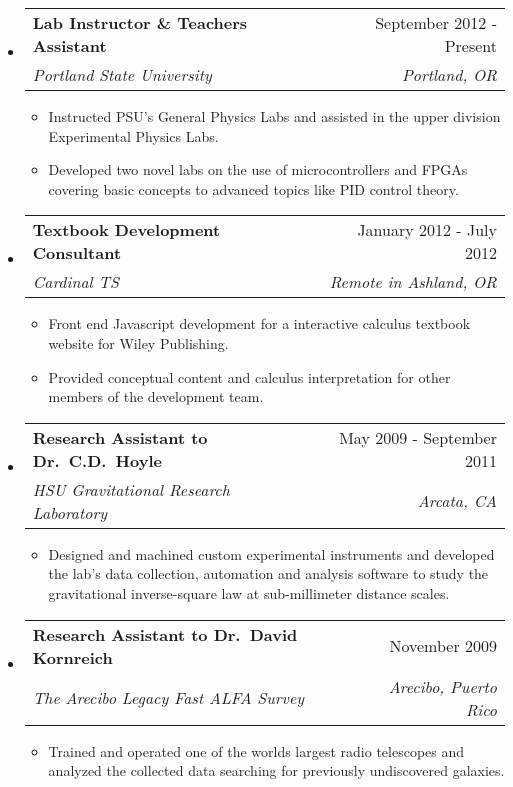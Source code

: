 \documentclass[letterpaper,11pt]{article}
\makeatletter
\newcommand{\resitem}[1]{\item #1 \vspace{-2pt}}
\newcommand{\ressubheading}[4]{
\begin{tabular*}{7.0in}{l@{\extracolsep{\fill}}r}
		\textbf{#1} & #2 \\
		\textit{#3} & \textit{#4} \\
\end{tabular*}\vspace{-6pt}}
\makeatother
\begin{document}
\begin{itemize}
\item
\ressubheading
{Lab Instructor \& Teachers Assistant}
{September 2012 - Present}
{Portland State University}
{Portland, OR}
\begin{itemize}
	\resitem
    {Instructed PSU's General Physics Labs and assisted in the upper division Experimental Physics Labs.}
	\resitem
    {Developed two novel labs on the use of microcontrollers and FPGAs covering basic concepts to advanced topics like PID control theory.}
\end{itemize}

\item
\ressubheading{Textbook Development Consultant}{January 2012 - July 2012}{Cardinal TS}{Remote in Ashland, OR}
\begin{itemize}
    \resitem
    {Front end Javascript development for a interactive calculus textbook website for Wiley Publishing.}
	\resitem
    {Provided conceptual content and calculus interpretation for other members of the development team.}
\end{itemize}

\item
\ressubheading
{Research Assistant to Dr.\ C\@.D.\ Hoyle}
{May 2009 - September 2011}
{HSU Gravitational Research Laboratory}
{Arcata, CA}
\begin{itemize}
    \resitem
    {Designed and machined custom experimental instruments and developed the lab's data collection, automation and analysis software to study the gravitational inverse-square law at sub-millimeter distance scales.}
\end{itemize}

\item
\ressubheading
{Research Assistant to Dr.\ David Kornreich}
{November 2009}
{The Arecibo Legacy Fast ALFA Survey}
{Arecibo, Puerto Rico}
\begin{itemize}
    \resitem
    {Trained and operated one of the worlds largest radio telescopes and analyzed the collected data searching for previously undiscovered galaxies.}
\end{itemize}


\end{itemize}
\end{document}
